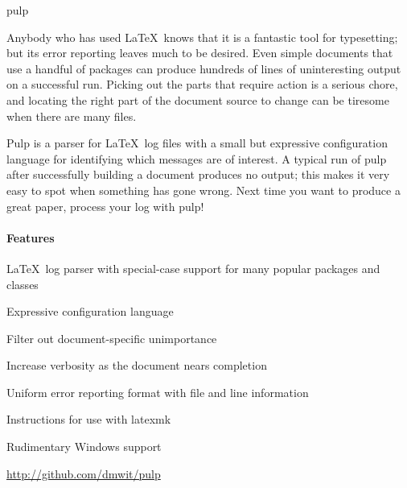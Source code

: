 \documentclass{scrreprt}
\begin{document}
\begin{hcarentry}{pulp}
\makeheader

Anybody who has used \LaTeX\ knows that it is a fantastic tool for
typesetting; but its error reporting leaves much to be desired. Even simple
documents that use a handful of packages can produce hundreds of lines of
uninteresting output on a successful run. Picking out the parts that require
action is a serious chore, and locating the right part of the document
source to change can be tiresome when there are many files.

Pulp is a parser for \LaTeX\ log files with a small but expressive
configuration language for identifying which messages are of interest. A
typical run of pulp after successfully building a document produces no
output; this makes it very easy to spot when something has gone wrong. Next
time you want to produce a great paper, process your log with pulp!

\paragraph*{Features}
\begin{compactitem}
	\item \LaTeX\ log parser with special-case support for many popular
		packages and classes
	\item Expressive configuration language
		\begin{compactitem}
			\item Filter out document-specific unimportance
			\item Increase verbosity as the document nears completion
		\end{compactitem}
	\item Uniform error reporting format with file and line information
	\item Instructions for use with latexmk
	\item Rudimentary Windows support
\end{compactitem}

%
%
%
%

\FurtherReading
  \url{http://github.com/dmwit/pulp}
\end{hcarentry}
\end{document}
